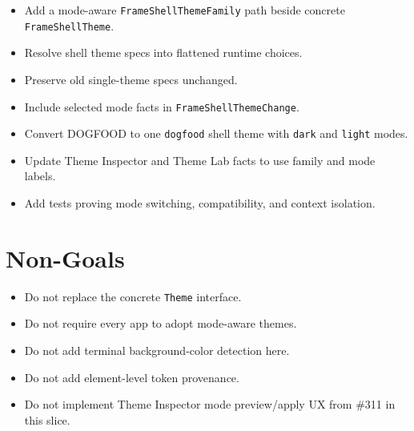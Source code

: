 \begin{itemize}
\tightlist
\item
  Add a mode-aware \texttt{F\allowbreak{}r\allowbreak{}a\allowbreak{}m\allowbreak{}e\allowbreak{}S\allowbreak{}h\allowbreak{}e\allowbreak{}l\allowbreak{}l\allowbreak{}T\allowbreak{}h\allowbreak{}e\allowbreak{}m\allowbreak{}e\allowbreak{}F\allowbreak{}a\allowbreak{}m\allowbreak{}i\allowbreak{}l\allowbreak{}y} path beside concrete \texttt{F\allowbreak{}r\allowbreak{}a\allowbreak{}m\allowbreak{}e\allowbreak{}S\allowbreak{}h\allowbreak{}e\allowbreak{}l\allowbreak{}l\allowbreak{}T\allowbreak{}h\allowbreak{}e\allowbreak{}m\allowbreak{}e}.
\item
  Resolve shell theme specs into flattened runtime choices.
\item
  Preserve old single-theme specs unchanged.
\item
  Include selected mode facts in \texttt{F\allowbreak{}r\allowbreak{}a\allowbreak{}m\allowbreak{}e\allowbreak{}S\allowbreak{}h\allowbreak{}e\allowbreak{}l\allowbreak{}l\allowbreak{}T\allowbreak{}h\allowbreak{}e\allowbreak{}m\allowbreak{}e\allowbreak{}C\allowbreak{}h\allowbreak{}a\allowbreak{}n\allowbreak{}g\allowbreak{}e}.
\item
  Convert DOGFOOD to one \texttt{d\allowbreak{}o\allowbreak{}g\allowbreak{}f\allowbreak{}o\allowbreak{}o\allowbreak{}d} shell theme with \texttt{d\allowbreak{}a\allowbreak{}r\allowbreak{}k} and \texttt{l\allowbreak{}i\allowbreak{}g\allowbreak{}h\allowbreak{}t} modes.
\item
  Update Theme Inspector and Theme Lab facts to use family and mode labels.
\item
  Add tests proving mode switching, compatibility, and context isolation.
\end{itemize}

\section{Non-Goals}\label{record-181-non-goals}

\begin{itemize}
\tightlist
\item
  Do not replace the concrete \texttt{T\allowbreak{}h\allowbreak{}e\allowbreak{}m\allowbreak{}e} interface.
\item
  Do not require every app to adopt mode-aware themes.
\item
  Do not add terminal background-color detection here.
\item
  Do not add element-level token provenance.
\item
  Do not implement Theme Inspector mode preview/apply UX from \#311 in this slice.
\end{itemize}

